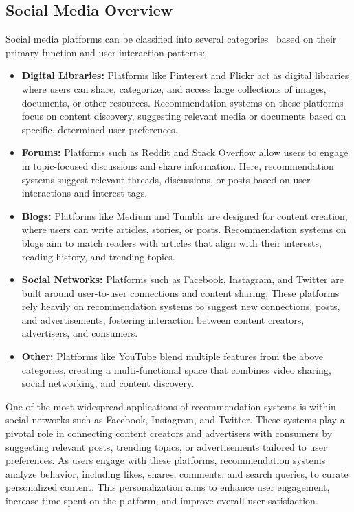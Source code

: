 \documentclass[10pt,twocolumn,twoside,a4paper]{report} %
\begin{document}
\subsection{Social Media Overview}
Social media platforms can be classified into several categories~\cite{anandhan2018social} based on their primary function and user interaction patterns:
\begin{itemize}
    \item \textbf{Digital Libraries:} Platforms like Pinterest and Flickr act as digital libraries where users can share, categorize, and access large collections of images, documents, or other resources. Recommendation systems on these platforms focus on content discovery, suggesting relevant media or documents based on specific, determined user preferences.
    \item \textbf{Forums:} Platforms such as Reddit and Stack Overflow allow users to engage in topic-focused discussions and share information. Here, recommendation systems suggest relevant threads, discussions, or posts based on user interactions and interest tags.
    \item \textbf{Blogs:} Platforms like Medium and Tumblr are designed for content creation, where users can write articles, stories, or posts. Recommendation systems on blogs aim to match readers with articles that align with their interests, reading history, and trending topics.
    \item \textbf{Social Networks:} Platforms such as Facebook, Instagram, and Twitter are built around user-to-user connections and content sharing. These platforms rely heavily on recommendation systems to suggest new connections, posts, and advertisements, fostering interaction between content creators, advertisers, and consumers.
    \item \textbf{Other:} Platforms like YouTube blend multiple features from the above categories, creating a multi-functional space that combines video sharing, social networking, and content discovery.
\end{itemize}

One of the most widespread applications of recommendation systems is within social networks such as Facebook, Instagram, and Twitter. These systems play a pivotal role in connecting content creators and advertisers with consumers by suggesting relevant posts, trending topics, or advertisements tailored to user preferences. As users engage with these platforms, recommendation systems analyze behavior, including likes, shares, comments, and search queries, to curate personalized content. This personalization aims to enhance user engagement, increase time spent on the platform, and improve overall user satisfaction.
\end{document}
